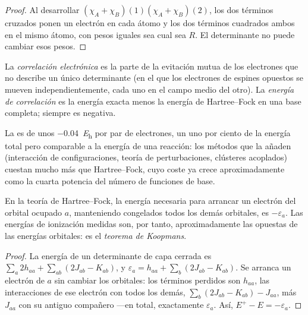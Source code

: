 \begin{proof}
Al desarrollar $(\chi_A + \chi_B)(1)(\chi_A + \chi_B)(2)$, los dos términos cruzados ponen un
electrón en cada átomo y los dos términos cuadrados ambos en el mismo átomo, con
pesos iguales sea cual sea $R$. El determinante no puede cambiar esos pesos.
\end{proof}

\begin{definition}\label{def:b3:computational-chemistry:correlation}
La \emph{correlación electrónica} es la parte de la
evitación mutua de los electrones que no describe un único determinante (en el que los
electrones de espines opuestos se mueven independientemente, cada uno en el campo medio
del otro). La \emph{energía de correlación} es la energía
exacta menos la energía de Hartree--Fock en una base completa; siempre es
negativa.
\end{definition}

La  es de unos \qty{-0.04}{\hartree} por par de electrones, un
uno por ciento de la energía total pero comparable a la energía de una reacción:
los métodos que la añaden (interacción de configuraciones, teoría de perturbaciones,
clústeres acoplados) cuestan mucho más que Hartree--Fock, cuyo coste ya crece
aproximadamente como la cuarta potencia del número de funciones de base.

\begin{theorem}\label{thm:b3:computational-chemistry:koopmans}
En la teoría de Hartree--Fock, la energía necesaria para arrancar un electrón del
orbital ocupado $a$, manteniendo congelados todos los demás orbitales, es $-\varepsilon_a$. Las
energías de ionización medidas son, por tanto, aproximadamente las opuestas de
las energías orbitales: es el \emph{teorema de Koopmans}.
\end{theorem}

\begin{proof}
La energía de un determinante de capa cerrada es $\sum_a2h_{aa} + \sum_{ab}(2J_{ab} -
K_{ab})$, y $\varepsilon_a = h_{aa} + \sum_b(2J_{ab} - K_{ab})$. Se arranca un electrón
de $a$ sin cambiar los orbitales: los términos perdidos son $h_{aa}$, las
interacciones de ese electrón con todos los demás, $\sum_b(2J_{ab} - K_{ab}) -
J_{aa}$, más $J_{aa}$ con su antiguo compañero ---en total, exactamente
$\varepsilon_a$. Así, $E^+ - E = -\varepsilon_a$.
\end{proof}

